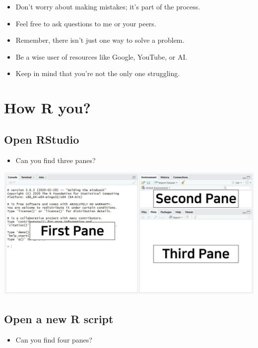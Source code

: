 \documentclass[
]{book}
\providecommand{\tightlist}{%
  \setlength{\itemsep}{0pt}\setlength{\parskip}{0pt}}
\begin{document}
\begin{itemize}
\item
  Don't worry about making mistakes; it's part of the process.
\item
  Feel free to ask questions to me or your peers.
\item
  Remember, there isn't just one way to solve a problem.
\item
  Be a wise user of resources like Google, YouTube, or AI.
\item
  Keep in mind that you're not the only one struggling.
\end{itemize}

\section{How R you?}\label{how-r-you}

\subsection{Open RStudio}\label{open-rstudio}

\begin{itemize}
\tightlist
\item
  Can you find three panes?
\end{itemize}

\includegraphics{./img/first_glance.jpg}

\subsection{Open a new R script}\label{open-a-new-r-script}

\begin{itemize}
\tightlist
\item
  Can you find four panes?
\end{itemize}
\end{document}
